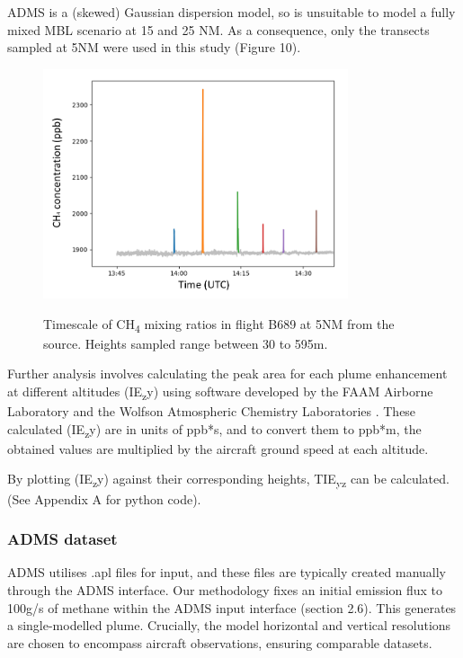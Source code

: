 \documentclass[12pt]{article}
\begin{document}
ADMS is a (skewed) Gaussian dispersion model, so is unsuitable to model a fully mixed MBL scenario at 15 and 25 NM. As a consequence, only the transects sampled at 5NM were used in this study (Figure 10). 

\begin{figure}[H]
\centering
\includegraphics[width=0.8\textwidth]{Plots/peak_id_b689.png}
\caption{\label{fig:volume source}} Timescale  of CH\textsubscript{4} mixing ratios in  flight B689 at 5NM from the source.  Heights sampled range between 30 to 595m.  
\end{figure}

Further analysis involves calculating the peak area for each plume enhancement at different altitudes (IE\textsubscript{z}y)  using software developed by the FAAM Airborne Laboratory and the Wolfson Atmospheric Chemistry Laboratories \parencite{Lacy2023Acruise-peakid} . These calculated (IE\textsubscript{z}y)   are in units of ppb*s, and to convert them to ppb*m, the obtained values are multiplied by the aircraft ground speed at each altitude. 

By  plotting (IE\textsubscript{z}y) against their corresponding heights, TIE\textsubscript{yz}  can be calculated. (See Appendix A for python code).

\subsubsection{ADMS dataset}

ADMS utilises .apl files for input, and these files are typically created manually through the ADMS interface. Our methodology fixes an initial emission flux to 100g/s of methane within the ADMS input interface (section 2.6). This generates a single-modelled plume. Crucially, the model horizontal and vertical resolutions are chosen to encompass aircraft observations, ensuring comparable datasets.
\end{document}
